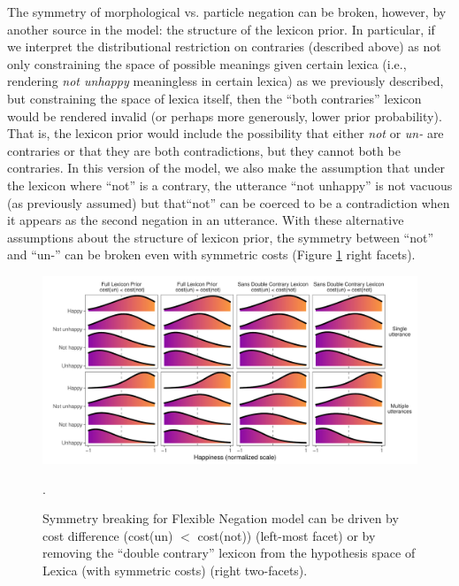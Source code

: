 \documentclass[floatsintext,doc]{apa6}
\begin{document}
The symmetry of morphological vs. particle negation can be broken, however, by another source in the model: the structure of the lexicon prior. 
In particular, if we interpret the distributional restriction on contraries (described above) as not only constraining the space of possible meanings given certain lexica (i.e., rendering \emph{not unhappy} meaningless in certain lexica) as we previously described, but constraining the space of lexica itself, then the ``both contraries'' lexicon would be rendered invalid (or perhaps more generously, lower prior probability). 
That is, the lexicon prior would include the possibility that either \emph{not} or \emph{un-} are contraries or that they are both contradictions,  but they cannot both be contraries. 
In this version of the model, we also make the assumption that under the lexicon where ``not'' is a contrary, the utterance  ``not unhappy'' is not vacuous (as previously assumed) but that``not'' can be coerced to be a contradiction when it appears as the second negation in an utterance. 
With these alternative assumptions about the structure of lexicon prior, the symmetry between ``not'' and ``un-'' can be broken even with symmetric costs (Figure \ref{fig:flexNeg_variants} right facets). 

\begin{figure}[t]
\centering \includegraphics{figs/flexNeg_SI.pdf} 
\caption{Symmetry breaking for Flexible Negation model can be driven by cost difference (cost(un) $<$ cost(not)) (left-most facet) or by removing the ``double contrary'' lexicon from the hypothesis space of Lexica (with symmetric costs) (right two-facets).}.\label{fig:flexNeg_variants}
\end{figure}
\end{document}
